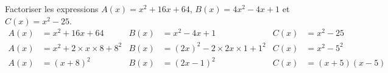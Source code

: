 \begin{exemples*1}
    Factoriser les expressions $A(x)=x^2+16x+64$, $B(x)=4x^2-4x+1$ et $C(x)=x^2-25$. 
    \begin{align*}
        A(x)&=x^2+16x+64&B(x)&=x^2-4x+1 &C(x)&=x^2-25\\
        A(x)&=x^2+2\times x\times8+8^2&B(x)&=(2x)^2-2\times2x\times1+1^2&C(x)&=x^2-5^2\\
        A(x)&=(x+8)^2&B(x)&=(2x-1)^2&C(x)&=(x+5)(x-5)
    \end{align*}
\end{exemples*1}


